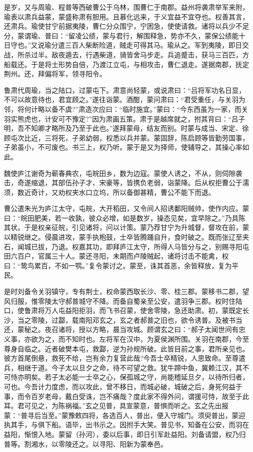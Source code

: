 \documentclass[12pt,UTF8]{ctexbook}
\begin{document}
是岁，又与周瑜、程普等西破曹公于乌林，围曹仁于南郡。益州将袭肃举军来附，瑜表以肃兵益蒙，蒙盛称肃有胆用。且慕化远来，于义宜益不宜夺也。权善其言，还肃兵。瑜使甘宁前据夷陵，曹仁分众围宁，宁困急，使使请救。诸将以兵少不足分，蒙谓瑜、普曰：“留凌公绩，蒙与君行，解围释急，势亦不久，蒙保公绩能十日守也。”又说瑜分遣三百人柴断险道，贼走可得其马。瑜从之。军到夷陵，即日交战，所杀过半。敌夜遁去，行遇柴道，骑皆舍马步走。兵追蹙击，获马三百匹，方船载还。于是将士形势自倍，乃渡江立屯，与相攻击，曹仁退走。遂据南郡，抚定荆州。还，拜偏将军，领寻阳令。

鲁肃代周瑜，当之陆口，过蒙屯下。肃意尚轻蒙，或说肃曰：“吕将军功名日显，不可以故意待也，君宜顾之。”遂往诣蒙。酒酣，蒙问肃曰：“君受重任，与关羽为邻，将何计略以备不虞?”肃造次应曰：“临时施宜。”蒙曰：“今东西虽为一家，而关羽实熊虎也，计安可不豫定?”因为肃画五策。肃于是越席就之，拊其背曰：“吕子明，吾不知卿才略所及乃至于此也。”遂拜蒙母，结友而别。时蒙与成当、宋定、徐顾屯次比近，三将死，子弟幼弱，权悉以兵并蒙。蒙固辞，陈启顾等皆勤劳国事，子弟虽小，不可废也。书三上，权乃听。蒙于是又为择师，使辅导之，其操心率如此。

魏使庐江谢奇为蕲春典农，屯皖田乡，数为边寇。蒙使人诱之，不从，则伺隙袭击，奇遂缩退，其部伍孙子才、宋豪等，皆携负老弱，诣蒙降。后从权拒曹公于濡须，数近奇计，又劝权夹水口立坞，所以备御甚精，曹公不能下而退。

曹公遣朱光为庐江太守，屯皖，大开稻田，又令间人招诱鄱阳贼帅，使作内应。蒙曰：“皖田肥美，若一收孰，彼众必增，如是数岁，操态见矣，宜早除之。”乃具陈其状。于是权亲征皖，引见诸将，问以计策。蒙乃荐甘宁为升城督，督攻在前，蒙以精锐继之。侵晨进攻，蒙手执枹鼓，士卒皆腾踊自升，食时破之。既而张辽至夹石，闻城已拔，乃退。权嘉其功，即拜庐江太守，所得人马皆分与之，别赐寻阳屯田六百户，官属三十人。蒙还寻阳，未期而卢陵贼起，诸将讨击不能禽，权曰：“鸷鸟累百，不如一鹗。”复令蒙讨之。蒙至，诛其首恶，余皆释放，复为平民。

是时刘备令关羽镇守，专有荆士，权命蒙西取长沙、零、桂三郡。蒙移书二郡，望风归服，惟零陵太守郝普城守不降。而备自蜀亲至公安，遣羽争三郡。权时住陆口，使鲁肃将万人屯益阳拒羽，而飞书召蒙，使舍零陵，急还助肃。初，蒙既定长沙，当之零陵，过酃，载南阳邓玄之，玄之者郝普之旧也，欲令诱普。及被书当还，蒙秘之。夜召诸将，授以方略，晨当攻城。顾谓玄之曰：“郝子太闻世间有忠义事，亦欲为之，而不知时也。左将军在汉中，为夏侯渊所围。关羽在南郡，今至尊身自临之。近者破樊本屯，救酃，逆为孙规所破。此皆目前之事，君所亲见也。彼方首尾倒悬，救死不给，岂有余力复营此哉?今吾士卒精锐，人思致命。至尊遣兵，相继于道。今子太以旦夕之命，待不可望之救。犹牛蹄中鱼，冀赖江汉，其不可恃亦明矣。若子太必能一士卒之心，保孤城之守，尚能稽延旦夕，以待所归者，可也。今吾计力度虑，而以攻此，曾不移日，而城必破，城破之后，身死何益于事，而令百岁老母，戴白受诛，岂不痛哉？度此家不得外问，谓援可恃，故至于此耳。君可见之，为陈祸福。”玄之见普，具宣蒙意，普惧而听之。玄之先出报蒙：“普寻后当至。”蒙豫敕四将，各选百人，普出，便入守城门。须臾普出，蒙迎执其手，与俱下船。语毕，出书示之。因拊手大笑。普见书，知备在公安，而羽在益阳，惭恨入地。蒙留（孙河），委以后事，即日引军赴益阳。刘备请盟，权乃归普等。割湘水，以零陵还之。以寻阳、阳新为蒙奉邑。
\end{document}
